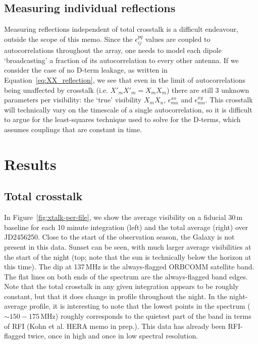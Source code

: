 \documentclass[10pt,a4paper,notitlepage]{article}
\begin{document}
\subsection{Measuring individual reflections}
\label{subsec:method_reflections}

Measuring reflections independent of total crosstalk is a difficult endeavour, outside the scope of this memo. Since the $\epsilon^{pq}_{ij}$ values are coupled to autocorrelations throughout the array, one needs to model each dipole `broadcasting' a fraction of its autocorrelation to every other antenna. If we consider the case of no D-term leakage, as written in Equation~\ref{eq:XX_reflection}, we see that even in the limit of autocorrelations being unaffected by crosstalk (i.e. $X'_mX'_m=X_mX_m$) there are still 3 unknown parameters per visibility: the `true' visibility $X_mX_n$, $\epsilon^{xx}_{mn}$ and $\epsilon^{xy}_{mn}$. This crosstalk will technically vary on the timescale of a single autocorrelation, so it is difficult to argue for the least-squares technique used to solve for the D-terms, which assumes couplings that are constant in time.

\section{Results}
\label{sec:results}

\subsection{Total crosstalk}
In Figure~\ref{fig:xtalk-per-file}, we show the average visibility on a fiducial 30\,m baseline for each 10 minute integration (left) and the total average (right) over JD2456250. Close to the start of the observation season, the Galaxy is not present in this data. Sunset can be seen, with much larger average visibilities at the start of the night (top; note that the sun is technically below the horizon at this time). The dip at 137\,MHz is the always-flagged ORBCOMM satellite band. The flat lines on both ends of the spectrum are the always-flagged band edges. Note that the total crosstalk in any given integration appears to be roughly constant, but that it does change in profile throughout the night. In the night-average profile, it is interesting to note that the lowest points in the spectrum ($\sim150-175$\,MHz) roughly corresponds to the quietest part of the band in terms of RFI (Kohn et al. HERA memo in prep.). This data has already been RFI-flagged twice, once in high and once in low spectral resolution. \\
\end{document}

